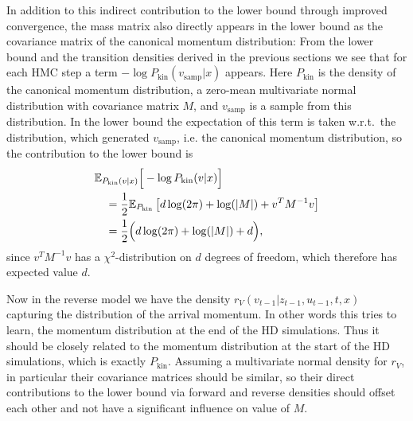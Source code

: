 In addition to this indirect contribution to the lower bound through improved convergence, the mass matrix also directly appears in the lower bound as the covariance matrix of the canonical momentum distribution: From the lower bound and the transition densities derived in the previous sections we see that for each HMC step a term $-\log P_\textrm{kin}(v_\textrm{samp}|x)$ appears. Here $P_\textrm{kin}$ is the density of the canonical momentum distribution, a zero-mean multivariate normal distribution with covariance matrix $M$, and $v_\textrm{samp}$ is a sample from this distribution. In the lower bound the expectation of this term is taken w.r.t.\ the distribution, which generated $v_\textrm{samp}$, i.e. the canonical momentum distribution, so the contribution to the lower bound is
\begin{equation}
\begin{split}
&\mathbb{E}_{P_\textrm{kin}(v|x)} \Big[ -\log P_\textrm{kin}(v|x) \Big] \\
&\quad= \frac{1}{2}\mathbb{E}_{P_\textrm{kin}} \left[d\log(2 \pi) + \log(|M|) +  v^T M^{-1} v \right] \\
&\quad= \frac{1}{2} \Big( d \log(2 \pi) + \log(|M|) + d \Big), 
\end{split}
\end{equation}
since $v^T M^{-1} v$ has a $\chi^2$-distribution on $d$ degrees of freedom, which therefore has expected value $d$. 

%
Now in the reverse model we have the density $r_V(v_{t-1}|z_{t-1}, u_{t-1}, t, x)$ capturing the distribution of the arrival momentum. In other words this tries to learn, the momentum distribution at the end of the HD simulations. Thus it should be closely related to the momentum distribution at the start of the HD simulations, which is exactly $P_\textrm{kin}$. Assuming a multivariate normal density for $r_V$, in particular their covariance matrices should be similar, so their direct contributions to the lower bound via forward and reverse densities should offset each other and not have a significant influence on value of $M$.

